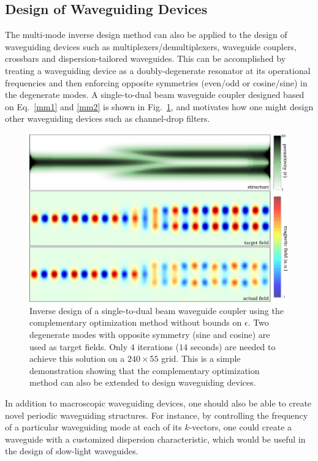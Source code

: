 \subsection{Design of Waveguiding Devices}
The multi-mode inverse design method can also be applied to the design of waveguiding devices such as multiplexers/demultiplexers, waveguide couplers, crossbars and dispersion-tailored waveguides. This can be accomplished by treating a waveguiding device as a doubly-degenerate resonator at its operational frequencies and then enforcing opposite symmetries (even/odd or cosine/sine) in the degenerate modes. A single-to-dual beam waveguide coupler designed based on Eq.~\eqref{mm1} and \eqref{mm2} is shown in Fig.~\ref{wg pic}, and motivates how one might design other waveguiding devices such as channel-drop filters. 
\begin{figure}[htbp]\centering
\includegraphics[width=\textwidth]{p1/wg}
\caption{Inverse design of a single-to-dual beam waveguide coupler using the complementary optimization method without bounds on $\epsilon$. Two degenerate modes with opposite symmetry (sine and cosine) are used as target fields. Only $4$ iterations ($14$ seconds) are needed to achieve this solution on a $240\times 55$ grid. This is a simple demonstration showing that the complementary optimization method can also be extended to design waveguiding devices.}
\label{wg pic}
\end{figure}
In addition to macroscopic waveguiding devices, one should also be able to create novel periodic waveguiding structures. For instance, by controlling the frequency of a particular waveguiding mode at each of its $k$-vectors, one could create a waveguide with a customized dispersion characteristic, which would be useful in the design of slow-light waveguides.


